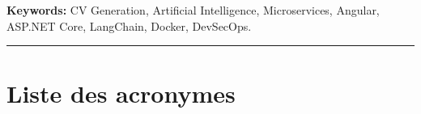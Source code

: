 \vspace{0.5cm}
\textbf{Keywords:} CV Generation, Artificial Intelligence, Microservices, Angular, ASP.NET Core, LangChain, Docker, DevSecOps.

\vspace{1cm}
\begin{center}
\rule{0.5\textwidth}{0.4pt}
\end{center}
\vspace{1cm}

\chapter*{Liste des acronymes}

\glsaddall
\printglossary[type=\acronymtype, title={}]
